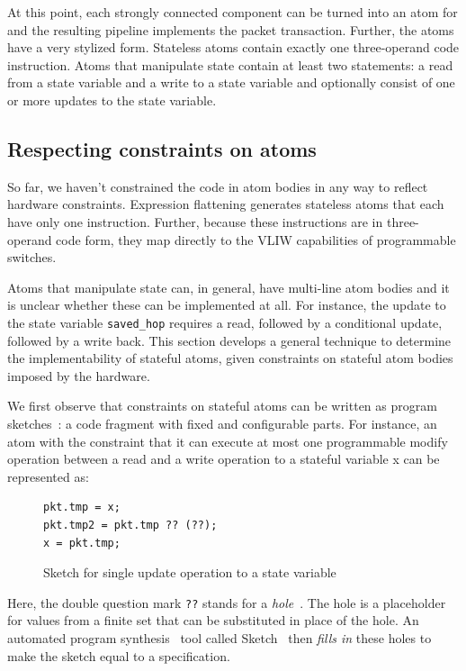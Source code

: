 At this point, each strongly connected component can be turned into an atom for
\absmachine and the resulting pipeline implements the packet transaction.
Further, the atoms have a very stylized form. Stateless atoms contain exactly
one three-operand code instruction. Atoms that manipulate state contain at
least two statements: a read from a state variable and a write to a state
variable and optionally consist of one or more updates to the state variable.

\subsection{Respecting constraints on atoms}

So far, we haven't constrained the code in atom bodies in any way to reflect
hardware constraints. Expression flattening generates stateless atoms that each
have only one instruction. Further, because these instructions are in
three-operand code form, they map directly to the VLIW capabilities of
programmable switches.

Atoms that manipulate state can, in general, have multi-line atom bodies and it
is unclear whether these can be implemented at all. For instance, the update to
the state variable \texttt{saved_hop} requires a read, followed by a
conditional update, followed by a write back. This section develops a general
technique to determine the implementability of stateful atoms, given
constraints on stateful atom bodies imposed by the hardware.

We first observe that constraints on stateful atoms can be written as program
sketches~\cite{bitstreaming, finite, sketch_manual}: a code fragment with fixed
and configurable parts. For instance, an atom with the constraint that it can
execute at most one programmable modify operation between a read and a write
operation to a stateful variable x can be represented as:
\begin{figure}
\begin{tiny}
\begin{lstlisting}
pkt.tmp = x;
pkt.tmp2 = pkt.tmp ?? (??);
x = pkt.tmp;
\end{lstlisting}
\end{tiny}
\caption{Sketch for single update operation to a state variable}
\end{figure}
Here, the double question mark \texttt{??} stands for a
\textit{hole}~\cite{sketch_manual}. The hole is a placeholder for values from a
finite set that can be substituted in place of the hole. An automated program
synthesis~\cite{synthesis} tool called Sketch~\cite{sketch_manual} then
\textit{fills in} these holes to make the sketch equal to a specification.


